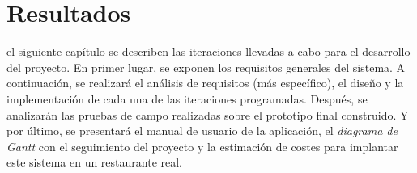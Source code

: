 
\chapter{Resultados}
\label{chap:results}
 el siguiente capítulo se describen las iteraciones llevadas a cabo 
para el desarrollo del proyecto. En primer lugar, se exponen los requisitos 
generales del sistema. A continuación, se realizará el análisis de requisitos 
(más específico), el diseño y la implementación de cada una de las iteraciones
programadas. Después, se analizarán las pruebas de campo realizadas sobre
el prototipo final construido. Y por último, se presentará el manual de usuario
de la aplicación, el \emph{diagrama de Gantt} con el seguimiento del proyecto
y la estimación de costes para implantar este sistema en un restaurante real.

